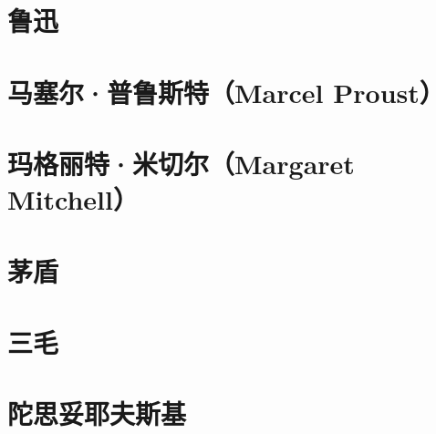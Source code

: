 \documentclass[12pt,utf8]{book}
\begin{document}
\chapter{鲁迅}


\clearpage


\chapter{马塞尔·普鲁斯特（Marcel Proust）}

% 


\chapter{玛格丽特·米切尔（Margaret Mitchell）}


\clearpage


% 






\chapter{茅盾}

% 














\chapter{三毛}



% 
% 
% 
% 
% 
% 
% 


\chapter{陀思妥耶夫斯基}
\end{document}
